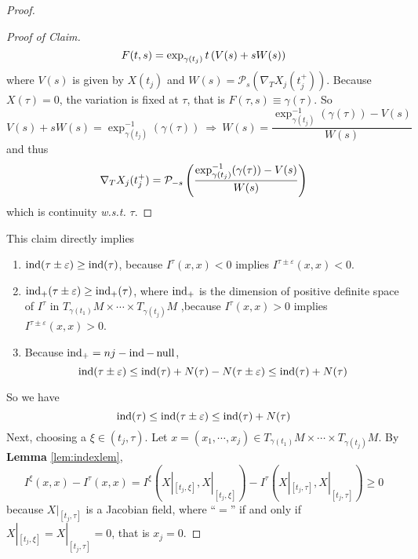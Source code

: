 \begin{enumerate}[label=\arabic{*}.]
\begin{proof}
\begin{proof}[Proof of Claim]
			\begin{equation*}
				F(t,s) = \exp_{\gamma(t_j)}t\left(V(s)+sW(s)\right)
			\end{equation*}
			where $V(s)$ is given by $X(t_j)$ and $W(s) = \mathcal{P}_s(\nabla_TX_j(t_j^+))$. Because $X(\tau) = 0$, the variation is fixed at $\tau$, that is $F(\tau,s) \equiv \gamma(\tau)$. So
			\begin{equation*}
				V(s) + sW(s) = \exp_{\gamma(t_j)}^{-1}(\gamma(\tau)) ~\Rightarrow~ W(s) = \frac{\exp_{\gamma(t_j)}^{-1}(\gamma(\tau)) - V(s)}{W(s)}
			\end{equation*}
			and thus
			\begin{equation*}
				\nabla_TX_j(t_j^+) = \mathcal{P}_{-s}\left(\frac{\exp_{\gamma(t_j)}^{-1}(\gamma(\tau)) - V(s)}{W(s)}\right)
			\end{equation*}
			which is continuity \emph{w.s.t.} $\tau$.
		\end{proof}
		This claim directly implies
		\begin{enumerate}[label=(\roman*)]
			\item $\operatorname{ind}(\tau \pm \varepsilon) \geq \operatorname{ind}(\tau)$, because $I^\tau(x,x) < 0$ implies $I^{\tau\pm\varepsilon}(x,x) < 0$.
			\item $\operatorname{ind}_+(\tau \pm \varepsilon) \geq \operatorname{ind}_+(\tau)$, where $\operatorname{ind}_+$ is the dimension of positive definite space of $I^\tau$ in $T_{\gamma(t_1)}M \times \cdots \times T_{\gamma(t_j)}M$ ,because $I^\tau(x,x) > 0$ implies $I^{\tau\pm\varepsilon}(x,x) > 0$.
			\item Because $\operatorname{ind}_+ = nj - \operatorname{ind} - \operatorname{null}$,
			\begin{equation*}
				\operatorname{ind}(\tau \pm \varepsilon) \leq \operatorname{ind}(\tau) + N(\tau) - N(\tau  \pm \varepsilon) \leq \operatorname{ind}(\tau) + N(\tau)
			\end{equation*}
		\end{enumerate}
		So we have
		\begin{equation*}
			\operatorname{ind}(\tau) \leq \operatorname{ind}(\tau \pm \varepsilon) \leq \operatorname{ind}(\tau) + N(\tau)
		\end{equation*}
		Next, choosing a $\xi \in (t_j,\tau)$. Let $x = (x_1,\cdots,x_j) \in T_{\gamma(t_1)}M \times \cdots \times T_{\gamma(t_j)}M$. By \textbf{Lemma} \ref{lem:indexlem},
		\begin{equation*}
			I^\xi(x,x) - I^\tau(x,x) = I^\xi(X|_{[t_j,\xi]},X|_{[t_j,\xi]}) - I^\tau(X|_{[t_j,\tau]},X|_{[t_j,\tau]}) \geq 0
		\end{equation*}
		because $X|_{[t_j,\tau]}$ is a Jacobian field, where ``$=$'' if and only if $X|_{[t_j,\xi]} =X|_{[t_j,\tau]} = 0$, that is $x_j = 0$.

\end{proof}
\end{enumerate}
